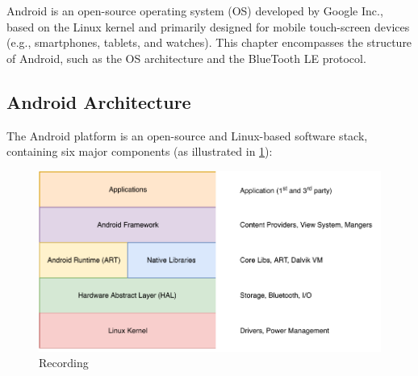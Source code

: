 Android is an open-source operating system (OS) developed by Google Inc., based on the Linux kernel and primarily designed for mobile touch-screen devices (e.g., smartphones, tablets, and watches). This chapter encompasses the structure of Android, such as the OS architecture and the BlueTooth LE protocol.

\subsection{Android Architecture}
The Android platform is an open-source and Linux-based software stack, containing six major components \cite{androidplatform} (as illustrated in \ref{fig:androidarhitecture}): 

\begin{figure}[h!]
    \centering
    \includegraphics[scale=0.85]{images/Android.pdf}
    \caption{Recording}
    \label{fig:androidarhitecture}
\end{figure}


